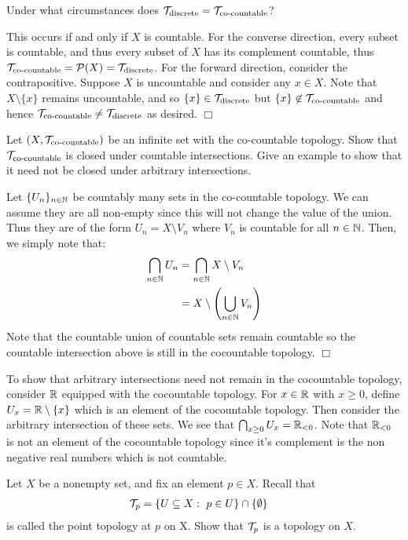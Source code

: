\documentclass{article}
\begin{document}
\begin{spacedenumerate}
\begin{spacedenumerate}
        \item Under what circumstances does $\mathcal{T}_{\text{discrete}} = \mathcal{T}_{\text{co-countable}}$?
        
        This occurs if and only if $X$ is countable. For the converse direction, every subset is countable, and thus every subset of $X$ has its complement countable, thus $\mathcal{T}_{\text{co-countable}} = \mathcal{P}(X) = \mathcal{T}_{\text{discrete}}$. For the forward direction, consider the contrapositive. Suppose $X$ is uncountable and consider any $x\in X$. Note that $X\setminus\{x\}$ remains uncountable, and so $\{x\} \in \mathcal{T}_{\text{discrete}}$ but $\{x\}\not\in \mathcal{T}_{\text{co-countable}}$ and hence $\mathcal{T}_{\text{co-countable}} \neq \mathcal{T}_{\text{discrete}}$ as desired. $\Box$ 
    \end{spacedenumerate}
    \item Let $(X, \mathcal{T}_{\text{co-countable}})$ be an infinite set with the co-countable topology. Show that $\mathcal{T}_{\text{co-countable}}$ is closed under countable intersections. Give an example to show that it need not be closed under arbitrary intersections.
    
    Let $\{U_{n}\}_{n\in \mathbb{N}}$ be countably many sets in the co-countable topology. We can assume they are all non-empty since this will not change the value of the union. Thus they are of the form $U_{n} = X\setminus V_{n}$ where $V_{n}$ is countable for all $n\in \mathbb{N}$. Then, we simply note that:
    \begin{align*}
        \bigcap_{n\in \mathbb{N}}U_{n} &= \bigcap_{n\in\mathbb{N}} X\setminus V_{n}\\
        &= X\setminus\left(\bigcup_{n\in\mathbb{N}} V_{n}\right)
    \end{align*} 
    Note that the countable union of countable sets remain countable so the countable intersection above is still in the cocountable topology. $\Box$

    To show that arbitrary intersections need not remain in the cocountable topology, consider $\mathbb{R}$ equipped with the cocountable topology. For $x \in \mathbb{R}$ with $x\geq 0$, define $U_{x} = \mathbb{R} \setminus \{x\}$ which is an element of the cocountable topology. Then consider the arbitrary intersection of these sets. We see that $\bigcap_{x\geq 0} U_{x} = \mathbb{R}_{< 0}$. Note that $\mathbb{R}_{< 0}$ is not an element of the cocountable topology since it's complement is the non negative real numbers which is not countable.

    \item Let $X$ be a nonempty set, and fix an element $p \in X$. Recall that
    \begin{align*}
        \mathcal{T}_{p} &= \{U\subseteq X:\ p\in U\}\cap\{\emptyset\}
    \end{align*}
    is called the point topology at $p$ on X. Show that $\mathcal{T}_{p}$ is a topology on $X$.


\end{spacedenumerate}
\end{document}

